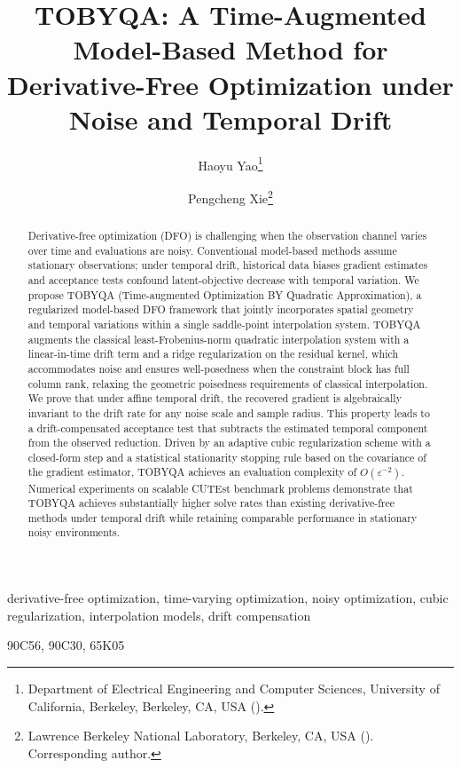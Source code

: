 \documentclass[final]{siamart171218}
\title{TOBYQA: A Time-Augmented Model-Based Method for
  Derivative-Free Optimization under Noise and Temporal
  Drift}
\author{Haoyu Yao\thanks{Department of Electrical Engineering and Computer
    Sciences, University of California, Berkeley, Berkeley, CA, USA
    (\email{julius06@foxmail.com}).}
  \and
  Pengcheng Xie\thanks{Lawrence Berkeley National Laboratory, Berkeley, CA,
    USA (\email{pxie@lbl.gov}). Corresponding author.}}
\begin{document}
\maketitle

\begin{abstract}
Derivative-free optimization (DFO) is challenging when the observation channel varies over time and evaluations are noisy. Conventional model-based methods assume stationary observations; under temporal drift, historical data biases gradient estimates and acceptance tests confound latent-objective decrease with temporal variation. We propose TOBYQA (Time-augmented Optimization BY Quadratic Approximation), a regularized model-based DFO framework that jointly incorporates spatial geometry and temporal variations within a single saddle-point interpolation system. TOBYQA augments the classical least-Frobenius-norm quadratic interpolation system with a linear-in-time drift term and a ridge regularization on the residual kernel, which accommodates noise and ensures well-posedness when the constraint block has full column rank, relaxing the geometric poisedness requirements of classical interpolation. We prove that under affine temporal drift, the recovered gradient is algebraically invariant to the drift rate for any noise scale and sample radius. This property leads to a drift-compensated acceptance test that subtracts the estimated temporal component from the observed reduction. Driven by an adaptive cubic regularization scheme with a closed-form step and a statistical stationarity stopping rule based on the covariance of the gradient estimator, TOBYQA achieves an evaluation complexity of $O(\varepsilon^{-2})$. Numerical experiments on scalable CUTEst benchmark problems demonstrate that TOBYQA achieves substantially higher solve rates than existing derivative-free methods under temporal drift while retaining comparable performance in stationary noisy environments.
\end{abstract}

\begin{keywords}
derivative-free optimization, time-varying optimization, noisy
optimization, cubic regularization, interpolation models, drift
compensation
\end{keywords}

\begin{AMS}
90C56, 90C30, 65K05
\end{AMS}











\end{document}

